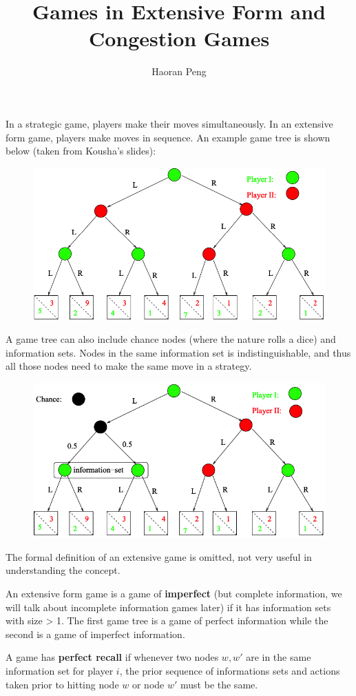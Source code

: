 \documentclass{article}
\begin{document}
	\title{Games in Extensive Form and Congestion Games}
	\author{Haoran Peng}
	\maketitle
In a strategic game, players make their moves simultaneously. In an extensive form game, players make moves in sequence. An example game tree is shown below (taken from Kousha's slides):
\begin{figure}[hbt!]
\centering
\includegraphics[width=.7\textwidth]{figs/tree1}
\end{figure}
A game tree can also include chance nodes (where the nature rolls a dice) and information sets. Nodes in the same information set is indistinguishable, and thus all those nodes need to make the same move in a strategy.
\begin{figure}[hbt!]
	\centering
	\includegraphics[width=.7\textwidth]{figs/tree2}
\end{figure}

The formal definition of an extensive game is omitted, not very useful in understanding the concept.

An extensive form game is a game of \textbf{imperfect} (but complete information, we will talk about incomplete information games later) if it has information sets with size > 1. The first game tree is a game of perfect information while the second is a game of imperfect information.

A game has \textbf{perfect recall} if whenever two nodes $w, w'$ are in the same information set for player $i$, the prior sequence of informations sets and actions taken prior to hitting node $w$ or node $w'$ must be the same. 
\end{document}
